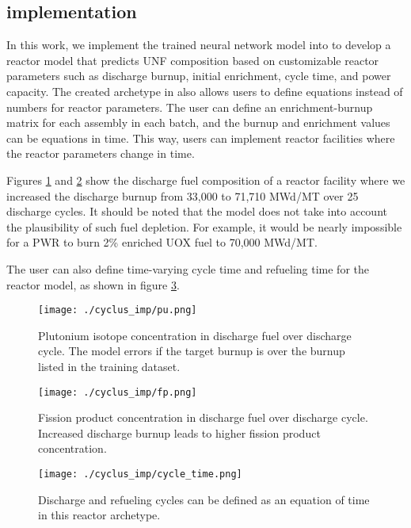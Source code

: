 \subsection{\Cyclus implementation}

In this work, we implement the trained neural
network model into \Cyclus to develop a reactor
model that predicts \gls{UNF} composition
based on customizable reactor parameters such as
discharge burnup, initial enrichment, cycle time, and power
capacity. The created archetype in \Cyclus also allows users to define
equations instead of numbers for reactor parameters.
The user can define an enrichment-burnup matrix for
each assembly in each batch, and the burnup and enrichment
values can be equations in time. This way, users can
implement reactor facilities where the reactor parameters
change in time.

Figures \ref{fig:cyclus_pu}
and \ref{fig:cyclus_fp} show the discharge fuel composition
of a reactor facility where we increased the discharge burnup
from 33,000 to 71,710 MWd/MT over 25 discharge cycles.
It should be noted that the model does not take into account
the plausibility of such fuel depletion. For example, it
would be nearly impossible for a  \gls{PWR} to burn 2\%
enriched \gls{UOX} fuel to 70,000 MWd/MT.

The user can also define time-varying
cycle time and refueling time for the reactor model, as shown
in figure \ref{fig:cyclus_time}.



\begin{figure}
    \centering
    \texttt{[image: ./cyclus\_imp/pu.png]}
    \caption{Plutonium isotope concentration in discharge fuel over discharge cycle. The model errors if the target burnup
    is over the burnup listed in the training dataset.}
    \label{fig:cyclus_pu}
\end{figure}


\begin{figure}
    \centering
    \texttt{[image: ./cyclus\_imp/fp.png]}
    \caption{Fission product concentration in discharge fuel over discharge cycle. Increased discharge burnup leads to higher fission product concentration.}
    \label{fig:cyclus_fp}
\end{figure}

\begin{figure}
    \centering
    \texttt{[image: ./cyclus\_imp/cycle\_time.png]}
    \caption{Discharge and refueling cycles can be defined as an equation of time in this reactor archetype.}
    \label{fig:cyclus_time}
\end{figure}

